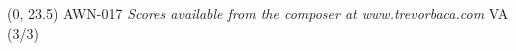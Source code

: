\documentclass[11pt]{report}
\begin{document}
\begin{textblock}{23}(0, 23.5)
AWN-017 \hfill
\textit{Scores available from the composer at www.trevorbaca.com} \hfill
VA (3/3)
\end{textblock}
\end{document}
